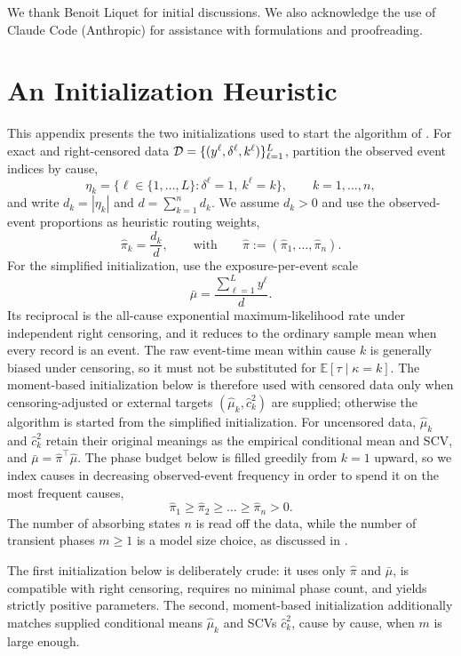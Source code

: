 \documentclass{article}
\newcommand{\ex}[1]{\mathbb{E}\left[#1\right]}
\newenvironment{rcrevision}{}{}
\newcommand{\subchg}[1]{#1}
\begin{document}
We thank Benoit Liquet for initial discussions. We also acknowledge the use of Claude Code (Anthropic) for assistance with formulations and proofreading.


\appendix
\appendixpage
\addappheadtotoc

\section{An Initialization Heuristic}
\label{sec:init-heuristic}

\begin{rcrevision}
This appendix presents the two initializations used to start the algorithm of . For exact and right-censored data ${\cal D}=\{(y^\ell,\delta^\ell,k^\ell)\}_{\ell=1}^L$, partition the observed event indices by cause,
\[
\eta_k = \{\ell \in \{1,\ldots,L\}:\delta^\ell=1,~k^\ell = k\},
\qquad
k = 1,\ldots,n,
\]
and write $d_k=|\eta_k|$ and $d=\sum_{k=1}^n d_k$. We assume $d_k>0$ and use the observed-event proportions as heuristic routing weights,
\[
\hat{\pi}_k = \frac{d_k}{d},
\qquad
\text{with}
\qquad
\hat{\pi} := (\hat{\pi}_1,\ldots,\hat{\pi}_n).
\]
For the simplified initialization, use the exposure-per-event scale
\begin{equation}
\label{eq:censored-init-scale}
\bar\mu=\frac{\sum_{\ell=1}^L y^\ell}{d}.
\end{equation}
Its reciprocal is the all-cause exponential maximum-likelihood rate under independent right censoring, and it reduces to the ordinary sample mean when every record is an event. The raw event-time mean within cause $k$ is generally biased under censoring, so it must not be substituted for $\ex{\tau\mid\kappa=k}$. The moment-based initialization below is therefore used with censored data only when censoring-adjusted or external targets $(\hat\mu_k,\hat c_k^2)$ are supplied; otherwise the algorithm is started from the simplified initialization. For uncensored data, $\hat\mu_k$ and $\hat c_k^2$ retain their original meanings as the empirical conditional mean and SCV, and $\bar\mu=\hat\pi^\intercal\hat\mu$. \subchg{The phase budget below is filled greedily from $k=1$ upward, so we index causes in decreasing observed-event frequency in order to spend it on the most frequent causes,}
\begin{equation}
\label{eq:pi-order}
\hat{\pi}_{1} \ge \hat{\pi}_{2} \ge \ldots \ge \hat{\pi}_{n} > 0.
\end{equation}
The number of absorbing states $n$ is read off the data, while the number of transient phases $m \ge 1$ is a model size choice, as discussed in .

The first initialization below is deliberately crude: it uses only $\hat\pi$ and $\bar\mu$, is compatible with right censoring, requires no minimal phase count, and yields strictly positive parameters. The second, moment-based initialization additionally matches supplied conditional means $\hat\mu_k$ and SCVs $\hat c_k^2$, cause by cause, when $m$ is large enough.
\end{rcrevision}
\end{document}
